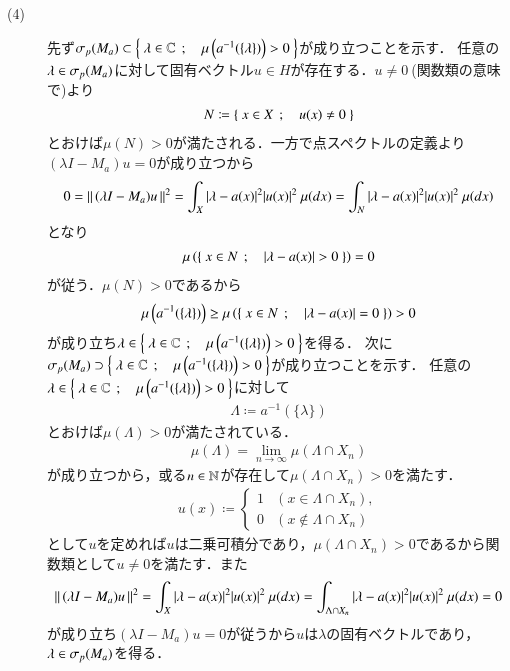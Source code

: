 \begin{prf}
\begin{description}
			\item[(4)] 
				先ず$\mathfrak{\sigma}_p (M_a) \subset \left\{\ \lambda \in \mathbb{C}\ \, ; \quad \mu\left( a^{-1}(\{\lambda\}) \right) > 0\ \right\}$が成り立つことを示す．
				任意の$\lambda \in \mathfrak{\sigma}_p (M_a)$に対して固有ベクトル$u \in H$が存在する．$u \neq 0\ $(関数類の意味で)より
				\begin{align}
					N \coloneqq \left\{\ x \in X\ \, ; \quad u(x) \neq 0\ \right\}
				\end{align}
				とおけば$\mu(N) > 0$が満たされる．一方で点スペクトルの定義より$(\lambda I - M_a)u = 0$が成り立つから
				\begin{align}
					0 = \left\|\, (\lambda I - M_a)u\, \right\|_{}^2 = \int_X |\lambda - a(x)|^2 |u(x)|^2\ \mu(dx)
					= \int_{N} |\lambda - a(x)|^2 |u(x)|^2\ \mu(dx)
				\end{align}
				となり
				\begin{align}
					\mu\left( \left\{\ x \in N\ \, ; \quad |\lambda - a(x)| > 0\ \right\} \right) = 0
				\end{align}
				が従う．$\mu(N) > 0$であるから
				\begin{align}
					\mu\left( a^{-1}(\{\lambda\}) \right)
					\geq \mu\left( \left\{\ x \in N\ \, ; \quad |\lambda - a(x)| = 0\ \right\} \right)
					> 0
				\end{align}
				が成り立ち$\lambda \in \left\{\ \lambda \in \mathbb{C}\ \, ; \quad \mu\left( a^{-1}(\{\lambda\}) \right) > 0\ \right\}$を得る．
				次に$\mathfrak{\sigma}_p (M_a) \supset \left\{\ \lambda \in \mathbb{C}\ \, ; \quad \mu\left( a^{-1}(\{\lambda\}) \right) > 0\ \right\}$が成り立つことを示す．
				任意の$\lambda \in \left\{\ \lambda \in \mathbb{C}\ \, ; \quad \mu\left( a^{-1}(\{\lambda\}) \right) > 0\ \right\}$に対して
				\begin{align}
					\Lambda \coloneqq a^{-1}(\{\lambda\})
				\end{align}
				とおけば$\mu(\Lambda) > 0$が満たされている．
				\begin{align}
					\mu(\Lambda) = \lim_{n \to \infty} \mu(\Lambda \cap X_n)
				\end{align}
				が成り立つから，或る$n \in \mathbb{N}$が存在して$\mu(\Lambda \cap X_n) > 0$を満たす．
				\begin{align}
					u(x) \coloneqq 
					\begin{cases}
						1 & (x \in \Lambda \cap X_n), \\
						0 & (x \notin \Lambda \cap X_n)
					\end{cases}
				\end{align}
				として$u$を定めれば$u$は二乗可積分であり，$\mu(\Lambda \cap X_n) > 0$であるから関数類として$u \neq 0$を満たす．また
				\begin{align}
					\left\|\, (\lambda I - M_a)u\, \right\|_{}^2
					= \int_X |\lambda - a(x)|^2 |u(x)|^2\ \mu(dx)
					= \int_{\Lambda \cap X_n} |\lambda - a(x)|^2 |u(x)|^2\ \mu(dx)
					= 0
				\end{align}
				が成り立ち$(\lambda I - M_a)u = 0$が従うから$u$は$\lambda$の固有ベクトルであり，$\lambda \in \mathfrak{\sigma}_p (M_a)$を得る．
		\end{description}
	\end{prf}